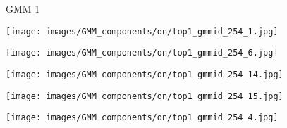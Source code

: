 \documentclass[10pt,twocolumn,letterpaper]{article}
\begin{document}
\begin{figure*}[t]
\centering
    \begin{minipage}[b]{0.005\textwidth}
    	\centering
    	\begin{turn}{90}
    GMM 1
    	\end{turn}
    	\vspace{2ex}
    \end{minipage}
    \hspace{0.01\textwidth}
    \begin{minipage}[b]{0.18\textwidth}
    	\centering
       	\texttt{[image: images/GMM\_components/on/top1\_gmmid\_254\_1.jpg]}
    \end{minipage}
    \hspace{0.005\textwidth}
    \begin{minipage}[b]{0.18\textwidth}
    	\centering
       	\texttt{[image: images/GMM\_components/on/top1\_gmmid\_254\_6.jpg]}
    \end{minipage}
    \hspace{0.005\textwidth}
    \begin{minipage}[b]{0.18\textwidth}
    	\centering
       	\texttt{[image: images/GMM\_components/on/top1\_gmmid\_254\_14.jpg]}
    \end{minipage}
    \hspace{0.005\textwidth}
	\begin{minipage}[b]{0.18\textwidth}
    	\centering
       	\texttt{[image: images/GMM\_components/on/top1\_gmmid\_254\_15.jpg]}
    \end{minipage}
    \hspace{0.005\textwidth}
    \begin{minipage}[b]{0.18\textwidth}
    	\centering
       	\texttt{[image: images/GMM\_components/on/top1\_gmmid\_254\_4.jpg]}
    \end{minipage} 
	   

\end{figure*}
\end{document}
